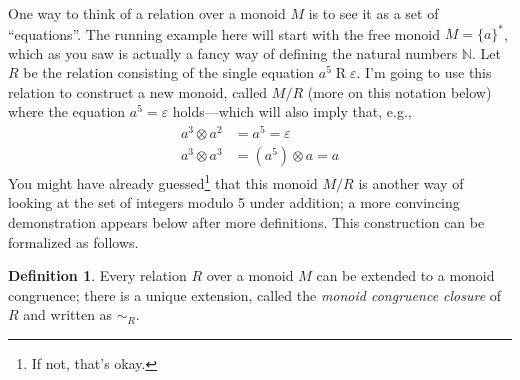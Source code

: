 \documentclass[headsepline,bibliography=totoc]{scrreport}
\theoremstyle{definition}
\theoremstyle{definition}
\newtheorem{definition}{Definition}[chapter]
\theoremstyle{definition}
\begin{document}
One way to think of a relation over a monoid $M$ is to see it as a set of ``equations''. The running example here will start with the free monoid $M=\{a\}^*$, which as you saw is actually a fancy way of defining the natural numbers $\mathbb{N}$. Let $R$ be the relation consisting of the single equation $a^5\mathrel{R}\varepsilon$. I'm going to use this relation to construct a new monoid, called $M/R$ (more on this notation below) where the equation $a^5=\varepsilon$ holds---which will also imply that, e.g.,
\begin{align*}
a^3\otimes a^2&=a^5=\varepsilon\\
a^3\otimes a^3&=(a^5)\otimes a=a
\end{align*}
You might have already guessed\footnote{If not, that's okay.} that this monoid $M/R$ is another way of looking at the set of integers modulo 5 under addition; a more convincing demonstration appears below after more definitions. This construction can be formalized as follows.

\begin{definition}
Every relation $R$ over a monoid $M$ can be extended to a monoid congruence; there is a unique extension, called the \emph{monoid congruence closure} of $R$ and written as $\sim_R$.
\end{definition}
\end{document}
